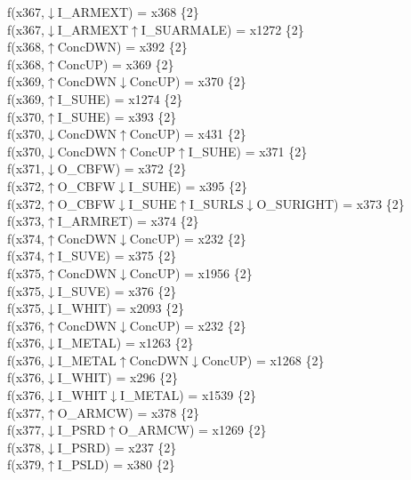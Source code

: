 f(x367,$\downarrow$I\_ARMEXT) = x368 \{2\} \\  
f(x367,$\downarrow$I\_ARMEXT$\uparrow$I\_SUARMALE) = x1272 \{2\} \\  
f(x368,$\uparrow$ConcDWN) = x392 \{2\} \\  
f(x368,$\uparrow$ConcUP) = x369 \{2\} \\  
f(x369,$\uparrow$ConcDWN$\downarrow$ConcUP) = x370 \{2\} \\  
f(x369,$\uparrow$I\_SUHE) = x1274 \{2\} \\  
f(x370,$\uparrow$I\_SUHE) = x393 \{2\} \\  
f(x370,$\downarrow$ConcDWN$\uparrow$ConcUP) = x431 \{2\} \\  
f(x370,$\downarrow$ConcDWN$\uparrow$ConcUP$\uparrow$I\_SUHE) = x371 \{2\} \\  
f(x371,$\downarrow$O\_CBFW) = x372 \{2\} \\  
f(x372,$\uparrow$O\_CBFW$\downarrow$I\_SUHE) = x395 \{2\} \\  
f(x372,$\uparrow$O\_CBFW$\downarrow$I\_SUHE$\uparrow$I\_SURLS$\downarrow$O\_SURIGHT) = x373 \{2\} \\  
f(x373,$\uparrow$I\_ARMRET) = x374 \{2\} \\  
f(x374,$\uparrow$ConcDWN$\downarrow$ConcUP) = x232 \{2\} \\  
f(x374,$\uparrow$I\_SUVE) = x375 \{2\} \\  
f(x375,$\uparrow$ConcDWN$\downarrow$ConcUP) = x1956 \{2\} \\  
f(x375,$\downarrow$I\_SUVE) = x376 \{2\} \\  
f(x375,$\downarrow$I\_WHIT) = x2093 \{2\} \\  
f(x376,$\uparrow$ConcDWN$\downarrow$ConcUP) = x232 \{2\} \\  
f(x376,$\downarrow$I\_METAL) = x1263 \{2\} \\  
f(x376,$\downarrow$I\_METAL$\uparrow$ConcDWN$\downarrow$ConcUP) = x1268 \{2\} \\  
f(x376,$\downarrow$I\_WHIT) = x296 \{2\} \\  
f(x376,$\downarrow$I\_WHIT$\downarrow$I\_METAL) = x1539 \{2\} \\  
f(x377,$\uparrow$O\_ARMCW) = x378 \{2\} \\  
f(x377,$\downarrow$I\_PSRD$\uparrow$O\_ARMCW) = x1269 \{2\} \\  
f(x378,$\downarrow$I\_PSRD) = x237 \{2\} \\  
f(x379,$\uparrow$I\_PSLD) = x380 \{2\} \\  
